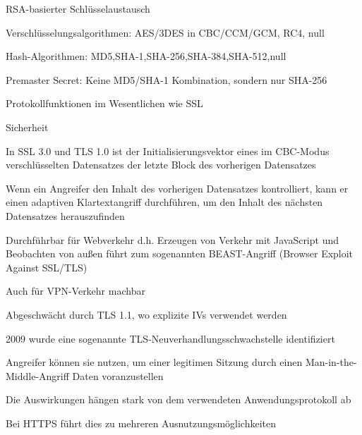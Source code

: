 \documentclass[a4paper]{article}
\begin{document}
\begin{multicols}{3}
\begin{itemize*}
\begin{itemize*}
\begin{itemize*}
                        \item RSA-basierter Schlüsselaustausch
                  \end{itemize*}
                  \item Verschlüsselungsalgorithmen: AES/3DES in CBC/CCM/GCM, RC4, null
                  \item Hash-Algorithmen: MD5,SHA-1,SHA-256,SHA-384,SHA-512,null
                  \item Premaster Secret: Keine MD5/SHA-1 Kombination, sondern nur SHA-256
            \end{itemize*}
            \item Protokollfunktionen im Wesentlichen wie SSL
            \item Sicherheit
            \begin{itemize*}
                  \item In SSL 3.0 und TLS 1.0 ist der Initialisierungsvektor eines im CBC-Modus verschlüsselten Datensatzes der letzte Block des vorherigen Datensatzes
                  \item Wenn ein Angreifer den Inhalt des vorherigen Datensatzes kontrolliert, kann er einen adaptiven Klartextangriff durchführen, um den Inhalt des nächsten Datensatzes herauszufinden
                  \item Durchführbar für Webverkehr d.h. Erzeugen von Verkehr mit JavaScript und Beobachten von außen führt zum sogenannten BEAST-Angriff (Browser Exploit Against SSL/TLS)
                  \item Auch für VPN-Verkehr machbar
                  \item Abgeschwächt durch TLS 1.1, wo explizite IVs verwendet werden
                  \item 2009 wurde eine sogenannte TLS-Neuverhandlungsschwachstelle identifiziert
                  \begin{itemize*}
                        \item Angreifer können sie nutzen, um einer legitimen Sitzung durch einen Man-in-the-Middle-Angriff Daten voranzustellen
                        \item Die Auswirkungen hängen stark von dem verwendeten Anwendungsprotokoll ab
                  \end{itemize*}
                  \item Bei HTTPS führt dies zu mehreren Ausnutzungsmöglichkeiten

\end{itemize*}
\end{itemize*}
\end{multicols}
\end{document}
